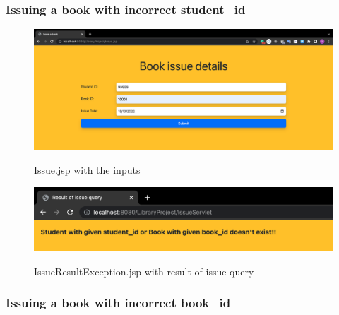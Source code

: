 \documentclass[12pt]{article}
\begin{document}
\newpage

\subsubsection{Issuing a book with incorrect student\_id}

\begin{figure}[!hbt]
    \centering
    \includegraphics[scale=0.34]{screenshots/b3_14.png}
    \label{fig:my_label1}
    \caption{Issue.jsp with the inputs}
\end{figure}
\vspace{2cm}
\begin{figure}[!hbt]
    \centering
    \includegraphics[scale=0.69]{screenshots/b3_15.png}
    \label{fig:my_label1}
    \caption{IssueResultException.jsp with result of issue query}
\end{figure}

\newpage

\subsubsection{Issuing a book with incorrect book\_id}
\end{document}

